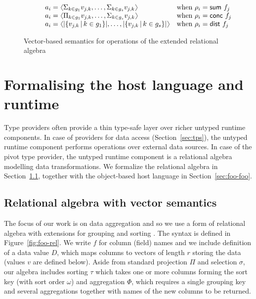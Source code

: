 \documentclass[a4paper,UKenglish]{lipics-v2016}
\theoremstyle{plain}
\theoremstyle{definition}
\newcommand{\vect}[1]{\langl #1 \rangl}
\newcommand{\langl}{\begin{picture}(4.5,7)
\put(1.1,2.5){\rotatebox{60}{\line(1,0){5.5}}}
\put(1.1,2.5){\rotatebox{300}{\line(1,0){5.5}}}
\end{picture}}
\newcommand{\rangl}{\begin{picture}(4.5,7)
\put(.9,2.5){\rotatebox{120}{\line(1,0){5.5}}}
\put(.9,2.5){\rotatebox{240}{\line(1,0){5.5}}}
\end{picture}}
\newcommand{\ident}[1]{\textnormal{\sffamily #1}}
\begin{document}
\begin{figure}
\begin{equation*}
\begin{array}{l}
\begin{array}{ll}
    \qquad a_i = \vect{\Sigma_{k\in g_1}v_{j,k}, \ldots, \Sigma_{k\in g_s}v_{j,k}} & \textnormal{when}~\rho_i = \ident{sum}~f_j \\
    \qquad a_i = \vect{\Pi_{k\in g_1}v_{j,k}, \ldots, \Sigma_{k\in g_s}v_{j,k}}   & \textnormal{when}~\rho_i = \ident{conc}~f_j \\
    \qquad a_i = \vect{|\{v_{j,k}\,|\, k\in g_1\}|, \ldots, |\{v_{j,k}\,|\, k\in g_s\}|}  & \textnormal{when}~\rho_i = \ident{dist}~f_j \\
  \end{array}\\
\end{array}
\end{equation*}

\caption{Vector-based semantics for operations of the extended relational algebra}
\label{fig:foo-relsem}
\end{figure}


\section{Formalising the host language and runtime}
\label{sec:foo}

Type providers often provide a thin type-safe layer over richer untyped runtime components. In case 
of providers for data access (Section~\ref{sec:tps}), the untyped runtime component performs operations
over external data sources. In case of the pivot type provider, the untyped runtime component 
is a relational algebra modelling data transformations. We formalize the relational algebra in 
Section~\ref{sec:foo-rel}, together with the object-based host language in Section~\ref{sec:foo-foo}.

\subsection{Relational algebra with vector semantics}
\label{sec:foo-rel}

The focus of our work is on data aggregation and so we use a form of relational algebra with 
extensions for grouping and sorting \cite{relalg,dbsys}. The syntax is defined in Figure~\ref{fig:foo-rel}.
We write $f$ for column (field) names and we include definition of a data value $D$, which maps
columns to vectors of length $r$ storing the data (values $v$ are defined below).
Aside from standard projection $\Pi$ and selection $\sigma$, our algebra includes sorting 
$\tau$ which takes one or more columns forming the sort key (with sort order $\omega$)
and aggregation $\Phi$, which requires a single grouping key and several aggregations together with 
names of the new columns to be returned.
\end{document}
